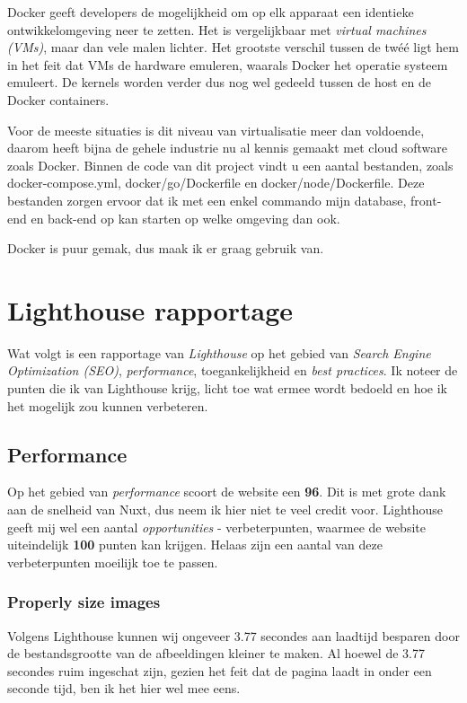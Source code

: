 \documentclass[a4paper]{report}
\begin{document}
    Docker geeft developers de mogelijkheid om op elk apparaat een identieke ontwikkelomgeving neer te zetten. Het is vergelijkbaar met \textit{virtual machines (VMs)}, maar dan
    vele malen lichter. Het grootste verschil tussen de twéé ligt hem in het feit dat VMs de hardware emuleren, waarals Docker het operatie systeem emuleert. De kernels worden
    verder dus nog wel gedeeld tussen de host en de Docker containers.

    Voor de meeste situaties is dit niveau van virtualisatie meer dan voldoende, daarom heeft bijna de gehele industrie nu al kennis gemaakt met cloud software zoals Docker.
    Binnen de code van dit project vindt u een aantal bestanden, zoals {\selectfont docker-compose.yml, docker/go/Dockerfile} en
    {\selectfont docker/node/Dockerfile}. Deze bestanden zorgen ervoor dat ik met een enkel commando mijn database, front-end en back-end op kan starten op welke omgeving dan ook.

    Docker is puur gemak, dus maak ik er graag gebruik van.

    \chapter{Lighthouse rapportage}
    Wat volgt is een rapportage van \textit{Lighthouse} op het gebied van \textit{Search Engine Optimization (SEO)},
    \textit{performance}, toegankelijkheid en \textit{best practices}.
    Ik noteer de punten die ik van Lighthouse krijg, licht toe wat ermee wordt bedoeld en hoe ik het mogelijk zou kunnen verbeteren.

    \section{Performance}
    Op het gebied van \textit{performance} scoort de website een \textbf{96}.
    Dit is met grote dank aan de snelheid van Nuxt, dus neem ik hier niet te veel credit voor.
    Lighthouse geeft mij wel een aantal \textit{opportunities} - verbeterpunten, waarmee de website uiteindelijk \textbf{100} punten kan krijgen.
    Helaas zijn een aantal van deze verbeterpunten moeilijk toe te passen.

    \subsection{Properly size images}
    Volgens Lighthouse kunnen wij ongeveer 3.77 secondes aan laadtijd besparen door de bestandsgrootte van de afbeeldingen kleiner te maken.
    Al hoewel de 3.77 secondes ruim ingeschat zijn, gezien het feit dat de pagina laadt in onder een seconde tijd, ben ik het hier wel mee eens.
\end{document}
